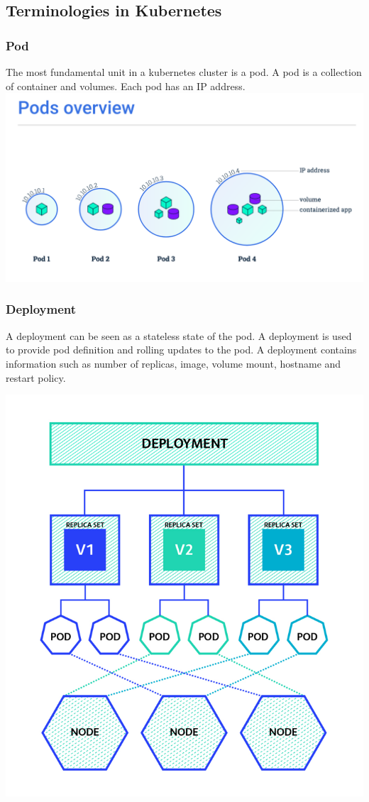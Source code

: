\documentclass[12pt]{article}
\begin{document}
\subsection{Terminologies in Kubernetes}
\subsubsection{Pod}
The most fundamental unit in a kubernetes cluster is a pod. A pod is a collection of container and volumes. Each pod has an IP address.\\
\includegraphics[width=\textwidth, trim= 0 0 0 5cm, clip=true]{pods}
\subsubsection{Deployment}
A deployment can be seen as a stateless state of the pod. A deployment is used to provide pod definition and rolling updates to the pod. A deployment contains information such as number of replicas, image, volume mount, hostname and restart policy.\\
\begin{center}
	\includegraphics[totalheight=0.45\textheight]{deploy}
\end{center}
\end{document}
